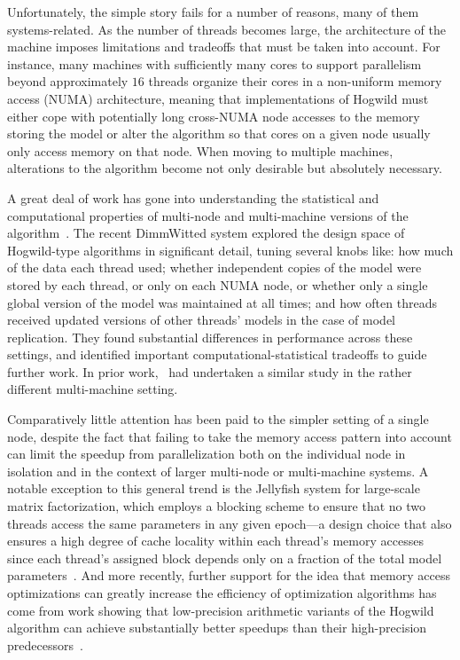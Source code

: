 \documentclass[times,11pt]{article}
\numberwithin{equation}{section}		%
\numberwithin{figure}{section}			%
\numberwithin{table}{section}				%
\begin{document}
Unfortunately, the simple story fails for a number of reasons, many of them systems-related. As the number of threads becomes large, the architecture of the machine
imposes limitations and tradeoffs that must be taken into account. For instance, many machines with sufficiently many cores to support parallelism beyond approximately $16$
threads organize their cores in a non-uniform memory access (NUMA) architecture, meaning that implementations of Hogwild must either cope with potentially long cross-NUMA node
accesses to the memory storing the model or alter the algorithm so that cores on a given node usually only access memory on that node. When moving to multiple machines,
alterations to the algorithm become not only desirable but absolutely necessary.

A great deal of work has gone into understanding the statistical and computational properties of multi-node and multi-machine versions of the algorithm~\cite{zhang2014dimmwitted, dean2012large}. The recent DimmWitted system
explored the design space of Hogwild-type algorithms in significant detail, tuning several knobs like: how much of the data each thread used; whether independent copies of the model were stored by each thread,
or only on each NUMA node, or whether only a single global version of the model was maintained at all times; and how often threads received updated versions of other threads' models in the case of model replication. They
found substantial differences in performance across these settings, and identified important computational-statistical tradeoffs to guide further work. In prior work,~\citet{dean2012large} had undertaken a similar study in the rather different multi-machine setting.

Comparatively little attention has been paid to the simpler setting of a single node, despite the fact that failing to take the memory access pattern into account can limit the speedup from parallelization
both on the individual node in isolation and in the context of larger multi-node or multi-machine systems. A notable exception to this general trend is the Jellyfish system for large-scale matrix factorization, which employs a 
blocking scheme to ensure that no two threads access the same parameters in any given epoch---a design choice that also ensures a high degree of cache locality within each thread's memory accesses since each thread's 
assigned block depends only on a fraction of the total model parameters~\citep{recht2013parallel}. And more recently, further support for the idea that memory access optimizations can greatly increase the efficiency of optimization algorithms
has come from work showing that low-precision arithmetic variants of the Hogwild algorithm can achieve substantially better speedups than their high-precision predecessors~\citep{de2015taming}.
\end{document}
